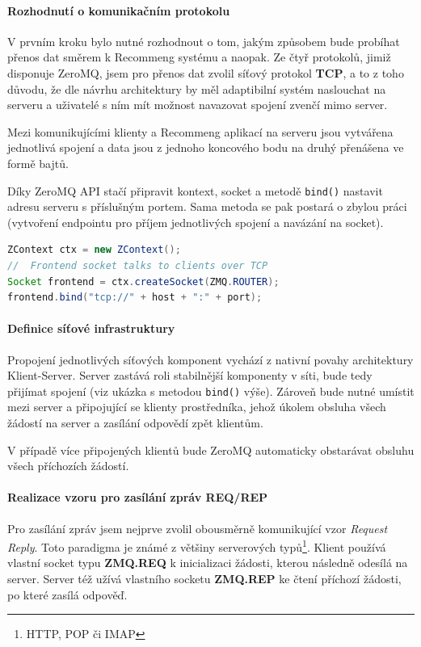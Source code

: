 \documentclass[thesis=M,czech]{FITthesis}[2014/05/07]
\begin{document}
\paragraph{Rozhodnutí o komunikačním protokolu}
\label{subsub:kompr}
V prvním kroku bylo nutné rozhodnout o tom, jakým způsobem bude probíhat přenos dat směrem k Recommeng systému a naopak. Ze čtyř protokolů, jimiž disponuje ZeroMQ, jsem pro přenos dat zvolil síťový protokol \textbf{TCP}, a to z toho důvodu, že dle návrhu architektury by měl adaptibilní systém naslouchat na serveru a uživatelé s ním mít možnost navazovat spojení zvenčí mimo server.

Mezi komunikujícími klienty a Recommeng aplikací na serveru jsou vytvářena jednotlivá spojení a data jsou z jednoho koncového bodu na druhý přenášena ve formě bajtů.

Díky ZeroMQ API stačí připravit kontext, socket a metodě \texttt{bind()} nastavit adresu serveru s příslušným portem. Sama metoda se pak postará o zbylou práci (vytvoření endpointu pro příjem jednotlivých spojení a navázání na socket).

\begin{lstlisting}[language=java]
ZContext ctx = new ZContext();
//  Frontend socket talks to clients over TCP
Socket frontend = ctx.createSocket(ZMQ.ROUTER);
frontend.bind("tcp://" + host + ":" + port);
\end{lstlisting}

\paragraph{Definice síťové infrastruktury}
\label{subsub:queue}
Propojení jednotlivých síťových komponent vychází z nativní povahy architektury Klient-Server. Server zastává roli stabilnější komponenty v síti, bude tedy přijímat spojení (viz ukázka s metodou \texttt{bind()} výše). Zároveň bude nutné umístit mezi server a připojující se klienty prostředníka, jehož úkolem obsluha všech žádostí na server a zasílání odpovědí zpět klientům.

V případě více připojených klientů bude ZeroMQ automaticky obstarávat obsluhu všech příchozích žádostí. 

\paragraph{Realizace vzoru pro zasílání zpráv REQ/REP}
Pro zasílání zpráv jsem nejprve zvolil obousměrně komunikující vzor \emph{Request Reply}. Toto paradigma je známé z většiny serverových typů\footnote{HTTP, POP či IMAP}. Klient používá vlastní socket typu \textbf{ZMQ.REQ} k inicializaci žádosti, kterou následně odesílá na server. Server též užívá vlastního socketu \textbf{ZMQ.REP} ke čtení příchozí žádosti, po které zasílá odpověď. 
\end{document}
